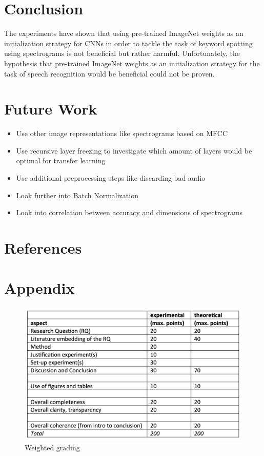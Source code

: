 \documentclass{article}
\theoremstyle{definition}
\theoremstyle{remark}
\begin{document}
\section{Conclusion}

The experiments have shown that using pre-trained ImageNet weights as an initialization strategy for CNNs in order to tackle the task of keyword spotting using spectrograms is not beneficial but rather harmful. Unfortunately, the hypothesis that pre-trained ImageNet weights as an initialization strategy for the task of speech recognition would be beneficial could not be proven.


\section{Future Work} \label{future_work}


\begin{itemize}
	\item Use other image representations like spectrograms based on MFCC
	\item Use recursive layer freezing to investigate which amount of layers would be optimal for transfer learning
	\item Use additional preprocessing steps like discarding bad audio
	\item Look further into Batch Normalization
	\item Look into correlation between accuracy and dimensions of spectrograms
\end{itemize}



\section{References}




\section{Appendix}

\begin{figure}[h]
    \centering
    \includegraphics[width=1\textwidth]{img/grading.png}
    \caption{Weighted grading}
    \label{fig:my_label}
\end{figure}
\end{document}
